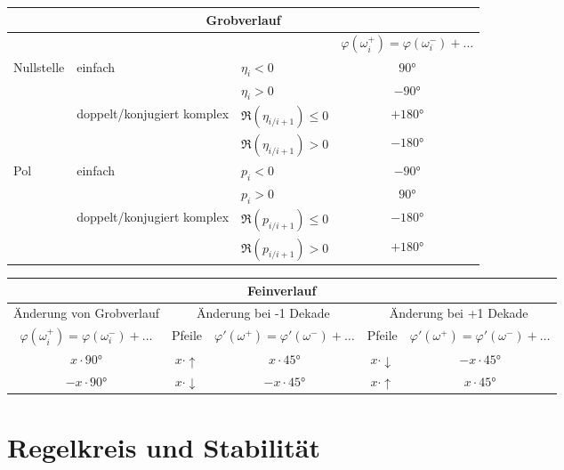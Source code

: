 \documentclass[10pt,a4paper]{article}
\begin{document}
\begin{center}
	\begin{tabular}{|l|l|l|c|}
		\hline
		\multicolumn{4}{|c|}{Grobverlauf} \\
		\hline
		\multicolumn{3}{|l|}{} & $\varphi(\omega_i^+) = \varphi(\omega_i^-) + \dots$ \\
		\hline
		\multirow{4}{*}{Nullstelle} & \multirow{2}{*}{einfach} & $\eta_i < 0$ & $90°$ \\
		\cline{3-4}
		& & $\eta_i > 0$ & $-90°$ \\
		\cline{2-4}
		& \multirow{2}{*}{doppelt/konjugiert komplex} & $\Re(\eta_{i/i+1}) ≤ 0$ & $+180°$ \\
		\cline{3-4}
		& & $\Re(\eta_{i/i+1}) > 0$ & $-180°$ \\
		\hline
		\multirow{4}{*}{Pol} & \multirow{2}{*}{einfach} & $p_i < 0$ & $-90°$ \\
		\cline{3-4}
		& & $p_i > 0$ & $90°$ \\
		\cline{2-4}
		& \multirow{2}{*}{doppelt/konjugiert komplex} & $\Re(p_{i/i+1}) ≤ 0$ & $-180°$ \\
		\cline{3-4}
		& & $\Re(p_{i/i+1}) > 0$ & $+180°$ \\
		\hline		
	\end{tabular}
\end{center}

\begin{center}
	\begin{tabular}{|c|c|c|c|c|}
		\hline
		\multicolumn{5}{|c|}{Feinverlauf} \\
		\hline
		Änderung von Grobverlauf & \multicolumn{2}{c|}{Änderung bei -1 Dekade} & \multicolumn{2}{c|}{Änderung bei +1 Dekade} \\
		$\varphi(\omega_i^+) = \varphi(\omega_i^-) + \dots $ & Pfeile & $\varphi'(\omega^+) = \varphi'(\omega^-) + \dots $ & Pfeile & $\varphi'(\omega^+) = \varphi'(\omega^-) + \dots$ \\
		\hline
		$x ⋅ 90°$ & $x ⋅ ↑$ & $ x ⋅ 45°$ & $x ⋅ ↓$ & $ -x ⋅ 45°$ \\
		\hline
		$-x ⋅ 90°$ & $x ⋅ ↓$ & $ -x ⋅ 45°$ & $x ⋅ ↑$ & $ x ⋅ 45°$ \\
		\hline
	\end{tabular}
\end{center}
	



\section{Regelkreis und Stabilität}
\end{document}
